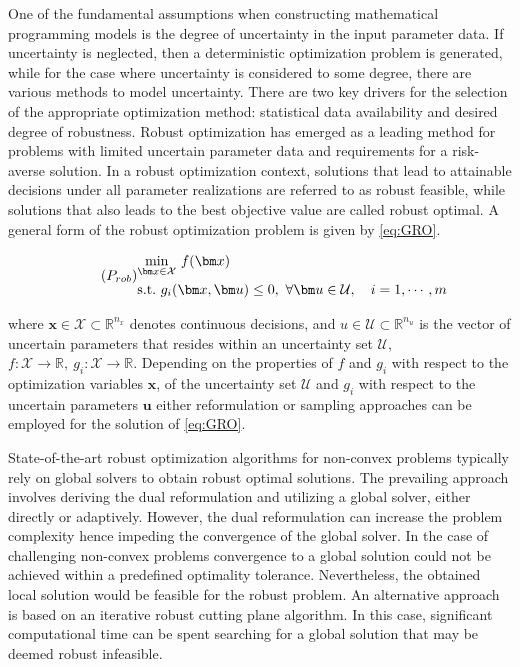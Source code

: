 \documentclass[sn-mathphys-num]{sn-jnl}
\begin{document}
One of the fundamental assumptions when constructing mathematical programming models is the degree of uncertainty in the input parameter data. If uncertainty is neglected, then a deterministic optimization problem is generated, while for the case where uncertainty is considered to some degree, there are various methods to model uncertainty. There are two key drivers for the selection of the appropriate optimization method: statistical data availability and desired degree of robustness. Robust optimization has emerged as a leading method for problems with limited uncertain parameter data and requirements for a risk-averse solution. In a robust optimization context, solutions that lead to attainable decisions under all parameter realizations are referred to as robust feasible, while solutions that also leads to the best objective value are called robust optimal. A general form of the robust optimization problem is given by \eqref{eq:GRO}. 

\begin{equation}\tag{$P_{rob}$}\label{eq:GRO}
\begin{aligned}
&\underset{\bm x\in \mathcal{X}}{\min}~f(\bm x)\\
&\text{s.t.}~ g_i(\bm x,\bm u)\leq 0,~\forall \bm u \in \mathcal{U},\quad i=1,\cdots,m
\end{aligned}
\end{equation}

where $\bm x\in \mathcal{X}\subset \mathbb{R}^{n_x}$ denotes continuous decisions, and $u \in \mathcal{U} \subset \mathbb{R}^{n_u} $ is the vector of uncertain parameters that resides within an uncertainty set $\mathcal{U}$, $f:\mathcal{X}\rightarrow\mathbb{R},~ g_i:\mathcal{X}\rightarrow\mathbb{R}$. Depending on the properties of $f$ and $g_i$ with respect to the optimization variables $\bm x$, of the  uncertainty set $\mathcal{U}$ and $g_i$ with respect to the uncertain parameters $\bm u$ either reformulation or sampling approaches can be employed for the solution of \eqref{eq:GRO}.

State-of-the-art robust optimization algorithms for non-convex problems typically rely on global solvers to obtain robust optimal solutions. The prevailing approach involves deriving the dual reformulation and utilizing a global solver, either directly or adaptively. However, the dual reformulation can increase the problem complexity hence impeding the convergence of the global solver. In the case of challenging non-convex problems convergence to a global solution could not be achieved within a predefined optimality tolerance. Nevertheless, the obtained local solution would be feasible for the robust problem. An alternative approach is based on an iterative robust cutting plane algorithm. In this case, significant computational time can be spent searching for a global solution that may be deemed robust infeasible. 
\end{document}
